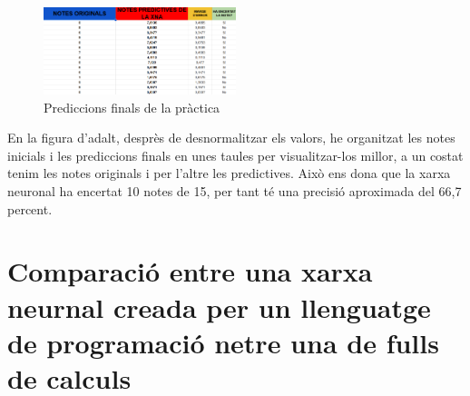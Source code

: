 \begin{figure}[H]
    \centering
    \includegraphics[width=0.5\textwidth]{./figures/Resultat_final.png}
    \caption{Prediccions finals de la pràctica}
\end{figure}

En la figura d'adalt, desprès de desnormalitzar els valors, he organitzat les notes inicials i les prediccions finals en unes taules per visualitzar-los millor, a un costat tenim les notes originals i per l'altre les predictives.
 Això ens dona que la xarxa neuronal ha encertat 10 notes de 15, per tant té una precisió aproximada del 66,7 percent.

\section{Comparació entre una xarxa neurnal creada per un llenguatge de programació netre una de fulls de calculs}

